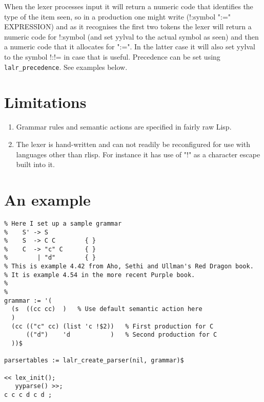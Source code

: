 When the lexer processes input it will return a numeric code that identifies
the type of the item seen, so in a production one might write
    (!:symbol ":=" EXPRESSION)
and as it recognises the first two tokens the lexer will return a numeric
code for !:symbol (and set yylval to the actual symbol as seen) and then
a numeric code that it allocates for ":=". In the latter case it will
also set yylval to the symbol !:!= in case that is useful.
%
Precedence can be set using \texttt{lalr\_precedence}. See examples below.



\section{Limitations}
\begin{enumerate}
\item Grammar rules and semantic actions are specified in fairly raw Lisp.
\item The lexer is hand-written and can not readily be reconfigured for
    use with languages other than rlisp. For instance it has use of "!"
    as a character escape built into it.
\end{enumerate}


\section{An example}
\begin{verbatim}
% Here I set up a sample grammar
%    S' -> S
%    S  -> C C        { }
%    C  -> "c" C      { }
%        | "d"        { }
% This is example 4.42 from Aho, Sethi and Ullman's Red Dragon book.
% It is example 4.54 in the more recent Purple book.
%
%
grammar := '(
  (s  ((cc cc)  )   % Use default semantic action here
  )
  (cc (("c" cc) (list 'c !$2))   % First production for C
      (("d")    'd           )   % Second production for C
  ))$

parsertables := lalr_create_parser(nil, grammar)$

<< lex_init();
   yyparse() >>;
c c c d c d ;
\end{verbatim}

\endinput


A grammar is given as a list of rules. Each rule has a single non-terminal
and then a seqence of productions for it. Each production can optionally
be provided with an associated semantic action.

